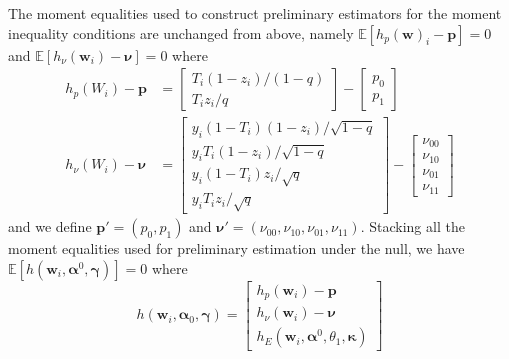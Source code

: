 \documentclass[12pt]{article}
\begin{document}
The moment equalities used to construct preliminary estimators for the moment inequality conditions are unchanged from above, namely $\mathbb{E}\left[ h_p(\mathbf{w})_i - \mathbf{p} \right] = 0$ and $\mathbb{E}\left[ h_\nu(\mathbf{w}_i) - \boldsymbol{\nu} \right] = 0$ where
\begin{align*}
h_p(W_i) - \mathbf{p} &= \left[
\begin{array}{l}
  T_i (1-z_i)/(1-q)\\ 
  T_i z_i / q 
\end{array}
\right] - \left[
\begin{array}{c}
  p_0 \\ p_1
\end{array}
\right]\\
h_\nu(W_i) - \boldsymbol{\nu} &= \left[
\begin{array}{l}
  y_i (1 - T_i) (1-z_i) / \sqrt{1-q}\\ 
  y_i T_i (1-z_i) / \sqrt{1-q} \\
  y_i (1 - T_i) z_i / \sqrt{q} \\
  y_i T_i z_i/\sqrt{q} 
\end{array}
\right] - \left[
\begin{array}{c}
  \nu_{00} \\
  \nu_{10} \\
  \nu_{01} \\
  \nu_{11} 
\end{array}
\right]
\end{align*}
and we define $\mathbf{p}'= (p_0, p_1)$ and $\boldsymbol{\nu}' = (\nu_{00}, \nu_{10}, \nu_{01}, \nu_{11})$.
Stacking all the moment equalities used for preliminary estimation under the null, we have $\mathbb{E}[h(\mathbf{w}_i, \boldsymbol{\alpha}^0, \boldsymbol{\gamma})] = 0$ where
\[
  h\left( \mathbf{w}_i, \boldsymbol{\alpha}_0,\boldsymbol{\gamma} \right) = \left[
  \begin{array}{l}
    h_p(\mathbf{w}_i) - \mathbf{p} \\
    h_\nu(\mathbf{w}_i) - \boldsymbol{\nu} \\
    h_E(\mathbf{w}_i, \boldsymbol{\alpha}^0, \theta_1, \boldsymbol{\kappa}) 
  \end{array}
\right]
\]
\end{document}
